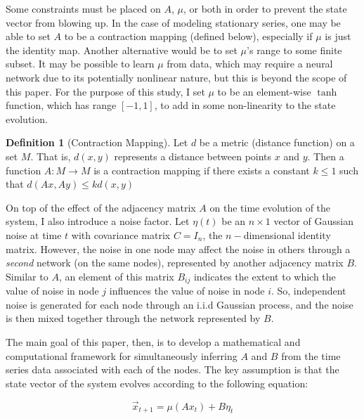 \documentclass[12pt]{article}
\theoremstyle{definition}
\newtheorem{definition}{Definition}[section]
\begin{document}
Some constraints must be placed on $A$, $\mu$, or both in order to prevent the state vector from blowing up. In the case of modeling stationary series, one may be able to set $A$ to be a contraction mapping (defined below), especially if $\mu$ is just the identity map. Another alternative would be to set $\mu$'s range to some finite subset. It may be possible to learn $\mu$ from data, which may require a neural network due to its potentially nonlinear nature, but this is beyond the scope of this paper. For the purpose of this study, I set $\mu$ to be an element-wise $\tanh$ function, which has range $[-1, 1]$, to add in some non-linearity to the state evolution.

\begin{definition}[Contraction Mapping]
Let $d$ be a metric (distance function) on a set $M$. That is, $d(x,y)$ represents a distance between points $x$ and $y$. Then a function $A: M \rightarrow M$ is a contraction mapping if there exists a constant $k \leq 1$ such that $d(Ax, Ay) \leq k d(x, y)$
\end{definition}

On top of the effect of the adjacency matrix $A$ on the time evolution of the system, I also introduce a noise factor. Let $\eta(t)$ be an $n \times 1$ vector of Gaussian noise at time $t$ with covariance matrix $C = I_n$, the $n-$dimensional identity matrix. However, the noise in one node may affect the noise in others through a \textit{second} network (on the same nodes), represented by another adjacency matrix $B$. Similar to $A$, an element of this matrix $B_{ij}$ indicates the extent to which the value of noise in node $j$ influences the value of noise in node $i$. So, independent noise is generated for each node through an i.i.d Gaussian process, and the noise is then mixed together through the network represented by $B$.

The main goal of this paper, then, is to develop a mathematical and computational framework for simultaneously inferring $A$ and $B$ from the time series data associated with each of the nodes. The key assumption is that the state vector of the system evolves according to the following equation:

\begin{equation}
    \label{eqn:stateEvolution}
    \Vec{x}_{t+1} = \mu(Ax_t) + B\eta_t
\end{equation}

\end{document}
